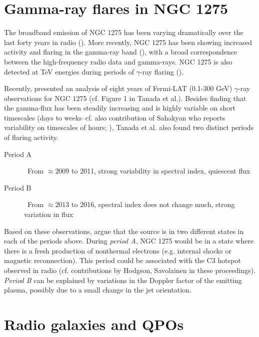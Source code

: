 \documentclass{iau}
\begin{document}
\section{Gamma-ray flares in NGC 1275}

The broadband emission of NGC 1275 has been varying dramatically over the last forty years in radio (\cite[Dutson et al. 2014]{Dutson2014}). More recently, NGC 1275 has been showing increased activity and flaring in the gamma-ray band (\cite[Tanada et al. 2018]{Tanada2018}), with a broad correspondence between the high-frequency radio data and gamma-rays. NGC 1275 is also detected at TeV energies during periods of $\gamma$-ray flaring (\cite[Aleksic et al. 2012]{Aleksic2012}).

Recently, \cite{Tanada2018} presented an analysis of eight years of Fermi-LAT (0.1-300 GeV) $\gamma$-ray observations for NGC 1275 (cf. Figure 1 in Tanada et al.). Besides finding that  the gamma-flux has been steadily increasing and is highly variable on short timescales (days to weeks--cf. also contribution of Sahakyan who reports variability on timescales of hours; \cite[Baghmanyan et al. 2017]{Baghmanyan2017}), Tanada et al. also found two distinct periods of flaring activity.
\begin{description}
	\item[Period A] \ From $\approx 2009$ to 2011, strong variability in spectral index, quiescent flux
	\item[Period B] \ From $\approx 2013$ to 2016, spectral index does not change much, strong variation in flux
\end{description}
Based on these observations, \cite{Tanada2018} argue that the source is in two different states in each of the periods above. During \textit{period A}, NGC 1275 would be in a state where there is a fresh production of nonthermal electrons (e.g.  internal shocks or magnetic reconnection). This period could be associated with the C3 hotspot observed in radio (cf. contributions by Hodgson, Savolainen in these proceedings). \textit{Period B} can be explained by variations in the Doppler factor of the emitting plasma, possibly due to a small change in the jet orientation.








\section{Radio galaxies and QPOs}
\end{document}
